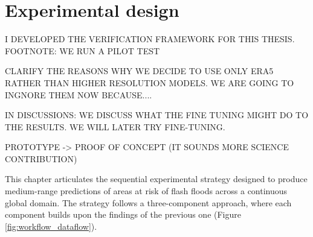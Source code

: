 \chapter{Experimental design}
\label{experimental_design}
\graphicspath{{chapter_03/figures}{chapter_03/tables}}


I DEVELOPED THE VERIFICATION FRAMEWORK FOR THIS THESIS. 
FOOTNOTE: WE RUN A PILOT TEST 

CLARIFY THE REASONS WHY WE DECIDE TO USE ONLY ERA5 RATHER THAN HIGHER RESOLUTION MODELS. WE ARE GOING TO INGNORE THEM NOW BECAUSE....

IN DISCUSSIONS: WE DISCUSS WHAT THE FINE TUNING MIGHT DO TO THE RESULTS. WE WILL LATER TRY FINE-TUNING.

PROTOTYPE -> PROOF OF CONCEPT (IT SOUNDS MORE SCIENCE CONTRIBUTION)


This chapter articulates the sequential experimental strategy designed to produce medium-range predictions of areas at risk of flash floods across a continuous global domain. The strategy follows a three-component approach, where each component builds upon the findings of the previous one (Figure \ref{fig:workflow_dataflow}). 

